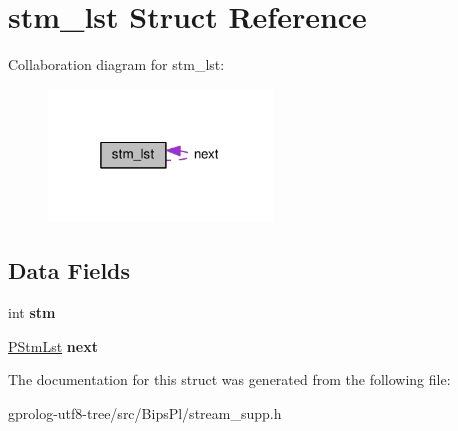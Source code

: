 \hypertarget{structstm__lst}{}\section{stm\+\_\+lst Struct Reference}
\label{structstm__lst}


Collaboration diagram for stm\+\_\+lst\+:\nopagebreak
\begin{figure}[H]
\begin{center}
\leavevmode
\includegraphics[width=169pt]{structstm__lst__coll__graph}
\end{center}
\end{figure}
\subsection*{Data Fields}
\begin{DoxyCompactItemize}
\item 
int {\bfseries stm}\hypertarget{structstm__lst_a69932b67f84be652c1d4fab80820a4cc}{}\label{structstm__lst_a69932b67f84be652c1d4fab80820a4cc}

\item 
\hyperlink{structstm__lst}{P\+Stm\+Lst} {\bfseries next}\hypertarget{structstm__lst_aaecf8566184bb06365a7de2d3ba8312b}{}\label{structstm__lst_aaecf8566184bb06365a7de2d3ba8312b}

\end{DoxyCompactItemize}


The documentation for this struct was generated from the following file\+:\begin{DoxyCompactItemize}
\item 
gprolog-\/utf8-\/tree/src/\+Bips\+Pl/stream\+\_\+supp.\+h\end{DoxyCompactItemize}
